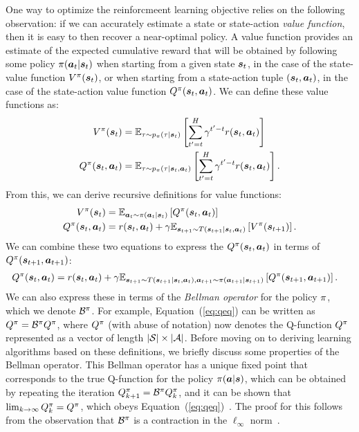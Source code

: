 \documentclass[../thesis.tex]{subfiles}
\begin{document}

One way to optimize the reinforcmeent learning objective relies on the following observation: if we can accurately estimate a state or state-action \emph{value function}, then it is easy to then recover a near-optimal policy. A value function provides an estimate of the expected cumulative reward that will be obtained by following some policy $\pi(\boldsymbol{a}_t|\boldsymbol{s}_t)$ when starting from a given state $\boldsymbol{s}_t$, in the case of the state-value function $V^\pi(\boldsymbol{s}_t)$, or when starting from a state-action tuple $(\boldsymbol{s}_t,\boldsymbol{a}_t)$, in the case of the state-action value function $Q^\pi(\boldsymbol{s}_t,\boldsymbol{a}_t)$. We can define these value functions as:
\begin{align*}
V^\pi(\boldsymbol{s}_t) &= \mathbb{E}_{\tau \sim p_\pi(\tau | \boldsymbol{s}_t)} \left[
\sum_{t' = t}^H \gamma^{t' - t} r(\boldsymbol{s}_t, \boldsymbol{a}_t)
\right] \\
Q^\pi(\boldsymbol{s}_t,\boldsymbol{a}_t) &= \mathbb{E}_{\tau \sim p_\pi(\tau | \boldsymbol{s}_t, \boldsymbol{a}_t)} \left[
\sum_{t' = t}^H \gamma^{t' - t} r(\boldsymbol{s}_t, \boldsymbol{a}_t)
\right].
\end{align*}
From this, we can derive recursive definitions for value functions:
\begin{align*}
V^\pi(\boldsymbol{s}_t) &= \mathbb{E}_{\boldsymbol{a}_t \sim \pi(\boldsymbol{a}_t | \boldsymbol{s}_t)}\left[
Q^\pi(\boldsymbol{s}_t,\boldsymbol{a}_t)
\right] \\
Q^\pi(\boldsymbol{s}_t, \boldsymbol{a}_t) &= r(\boldsymbol{s}_t,\boldsymbol{a}_t) + \gamma \mathbb{E}_{\boldsymbol{s}_{t+1} \sim T(\boldsymbol{s}_{t+1}|\boldsymbol{s}_t,\boldsymbol{a}_t)}\left[
V^\pi(\boldsymbol{s}_{t+1})
\right].
\end{align*}
We can combine these two equations to express the $Q^\pi(\boldsymbol{s}_t,\boldsymbol{a}_t)$ in terms of $Q^\pi(\boldsymbol{s}_{t+1},\boldsymbol{a}_{t+1})$:
\begin{align}
Q^\pi(\boldsymbol{s}_t, \boldsymbol{a}_t) &= r(\boldsymbol{s}_t,\boldsymbol{a}_t) + \gamma \mathbb{E}_{\boldsymbol{s}_{t+1} \sim T(\boldsymbol{s}_{t+1}|\boldsymbol{s}_t,\boldsymbol{a}_t), \boldsymbol{a}_{t+1} \sim \pi(\boldsymbol{a}_{t+1} | \boldsymbol{s}_{t+1})}\left[
Q^\pi(\boldsymbol{s}_{t+1},\boldsymbol{a}_{t+1})
\right]. \label{eq:qeq}
\end{align}
We can also express these in terms of the \emph{Bellman operator} for the policy $\pi$, which we denote $\mathcal{B}^\pi$. For example, Equation~(\ref{eq:qeq}) can be written as ${Q}^\pi = \mathcal{B}^\pi {Q}^\pi$, where ${Q}^\pi$ (with abuse of notation) now denotes the Q-function $Q^\pi$ represented as a vector of length $|\mathcal{S}|\times |\mathcal{A}|$. Before moving on to deriving learning algorithms based on these definitions, we briefly discuss some properties of the Bellman operator. This Bellman operator has a unique fixed point that corresponds to the true Q-function for the policy $\pi(\boldsymbol{a}|\boldsymbol{s})$, which can be obtained by repeating the iteration ${Q}^\pi_{k+1} = \mathcal{B}^\pi {Q}^\pi_k$, and it can be shown that $\lim_{k \rightarrow \infty} {Q}^\pi_k = {Q}^\pi$, which obeys Equation~(\ref{eq:qeq})~\citep{suttonrlbook}. The proof for this follows from the observation that $\mathcal{B}^\pi$ is a contraction in the $\ell_\infty$ norm~\citep{lagoudakis2003least}.
\end{document}
